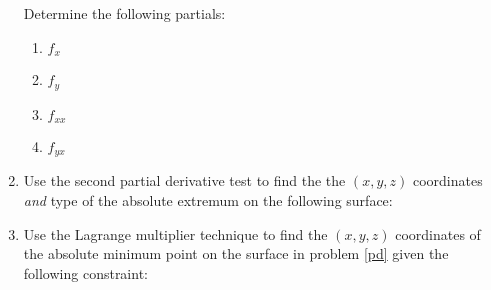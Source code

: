 \documentclass[letterpaper,12pt,fleqn]{article}
\begin{document}
\begin{enumerate}[left=0pt]
  \bigskip

  Determine the following partials:
  \begin{enumerate}[label={\alph*)}]
  \item \(f_x\)
  \item \(f_y\)
  \item \(f_{xx}\)
  \item \(f_{yx}\)
  \end{enumerate}

\item{\label{pd}} Use the second partial derivative test to find the the \((x,y,z)\) coordinates \emph{and} type of the
  absolute extremum on the following surface:

  \bigskip

  \begin{center}
    \scalebox{1.25}{\(\displaystyle z=5-x^2-2x-y^2+4y\)}
  \end{center}

  \bigskip

\item Use the Lagrange multiplier technique to find the \((x,y,z)\) coordinates of the absolute minimum
  point on the surface in problem \ref{pd} given the following constraint:

  \bigskip

  \begin{center}
    \scalebox{1.25}{\(\displaystyle 2x-y+4=0\)}
  \end{center}
\end{enumerate}
\end{document}
